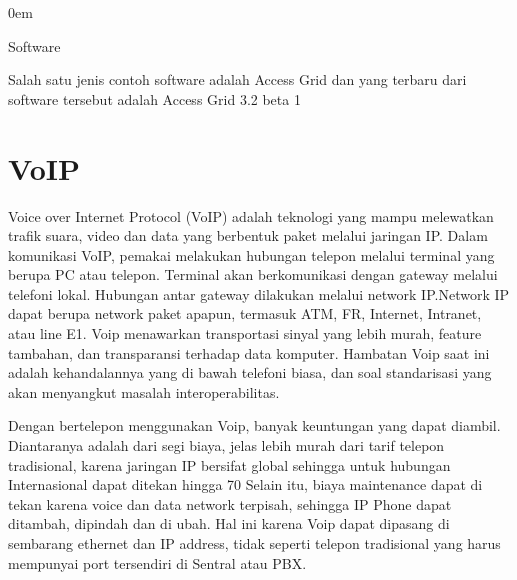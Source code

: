 \documentclass{jtetiproposalskripsi}
\begin{document}
\vspace{-0.5cm}
\begin{enumerate}[2.]
\begin{singlespace}
\itemsep0em
\item Software
\end{singlespace}
\end{enumerate}

\begin{enumerate}[a.]
\begin{singlespace}
\item Salah satu jenis contoh software adalah Access Grid dan yang terbaru dari software tersebut adalah Access Grid 3.2 beta 1
\end{singlespace}
\end{enumerate}

\section{VoIP}
Voice over Internet Protocol (VoIP) adalah teknologi yang mampu melewatkan trafik suara, video dan data yang berbentuk paket melalui jaringan IP. Dalam komunikasi VoIP, pemakai melakukan hubungan telepon melalui terminal yang berupa PC atau telepon. Terminal akan berkomunikasi dengan gateway melalui telefoni lokal. Hubungan antar gateway dilakukan melalui network IP.Network IP dapat berupa network paket apapun, termasuk ATM, FR, Internet, Intranet, atau line E1. Voip menawarkan transportasi sinyal yang lebih murah, feature tambahan, dan transparansi terhadap data komputer. Hambatan Voip saat ini adalah kehandalannya yang di bawah telefoni biasa, dan soal standarisasi yang akan menyangkut masalah interoperabilitas.

Dengan bertelepon menggunakan Voip, banyak keuntungan yang dapat diambil. Diantaranya adalah dari segi biaya, jelas lebih murah dari tarif telepon tradisional, karena jaringan IP bersifat global sehingga untuk hubungan Internasional dapat ditekan hingga 70%
Selain itu, biaya maintenance dapat di tekan karena voice dan data network terpisah, sehingga IP Phone dapat ditambah, dipindah dan di ubah. Hal ini karena Voip dapat dipasang di sembarang ethernet dan IP address, tidak seperti telepon tradisional yang harus mempunyai port tersendiri di Sentral atau PBX.
\end{document}
